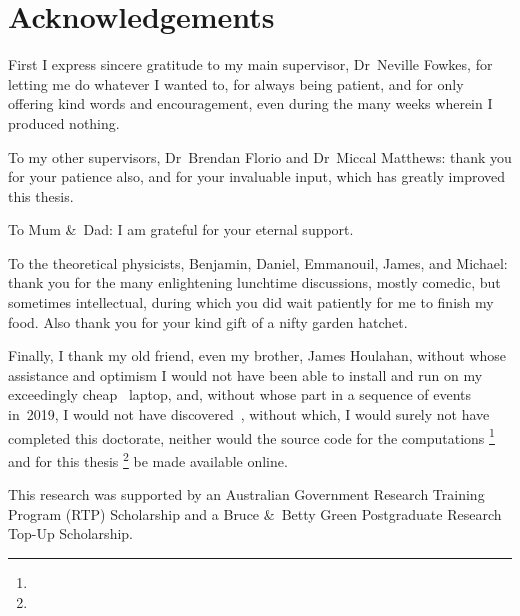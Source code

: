 \chapter{Acknowledgements}
\label{ch:acknowledgements}

\begin{loosecontent}

First I express sincere gratitude to my main supervisor,
Dr~Neville Fowkes,
for letting me do whatever I wanted to,
for always being patient,
and for only offering kind words and encouragement,
even during the many weeks wherein I produced nothing.

To my other supervisors,
Dr~Brendan Florio and Dr~Miccal Matthews:
thank you for your patience also,
and for your invaluable input,
which has greatly improved this thesis.

To Mum \&~Dad:
I am grateful for your eternal support.

To the theoretical physicists,
Benjamin, Daniel, Emmanouil, James, and Michael:
thank you for the many enlightening lunchtime discussions,
mostly comedic, but sometimes intellectual,
during which you did wait patiently for me to finish my food.
Also thank you for your kind gift of a nifty garden hatchet.

Finally, I thank my old friend, even my brother, James Houlahan,
without whose assistance and optimism
I would not have been able to install and run 
on my exceedingly cheap ~laptop,
and, without whose part in a sequence of events in~2019,
I would not have discovered~,
without which, I would surely not have completed this doctorate,
neither would the source code for the computations%
  \footnote{}
and for this thesis%
  \footnote{}
be made available online.

\end{loosecontent}

\thematicbreak

This research was supported
by an Australian Government Research Training Program (RTP) Scholarship
and a Bruce \&~Betty Green Postgraduate Research Top-Up Scholarship.
